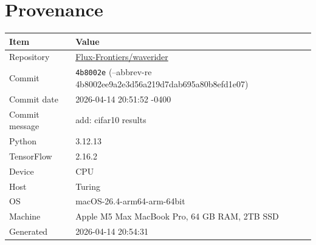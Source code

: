 \documentclass[11pt,letterpaper]{article}
\begin{document}
\section{Provenance}

\begin{tabular}{@{}ll@{}}
\toprule
\textbf{Item} & \textbf{Value} \\
\midrule
  Repository & \href{https://github.com/Flux-Frontiers/waverider}{Flux-Frontiers/waverider} \\
  Commit & \texttt{4b8002e} (--abbrev-re
4b8002ee9a2e3d56a219d7dab695a80b8efd1e07) \\
  Commit date & 2026-04-14 20:51:52 -0400 \\
  Commit message & add: cifar10 results \\
  Python & 3.12.13 \\
  TensorFlow & 2.16.2 \\
  Device & CPU \\
  Host & Turing \\
  OS & macOS-26.4-arm64-arm-64bit \\
  Machine & Apple M5 Max MacBook Pro, 64 GB RAM, 2TB SSD \\
  Generated & 2026-04-14 20:54:31 \\
\bottomrule
\end{tabular}
\end{document}
